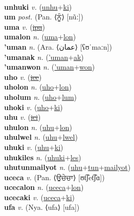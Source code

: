  \label{unhulyan} \\
\textbf{unhuki} \textit{v.} (\hyperref[unhu]{unhu}+\hyperref[ki]{ki})
 \label{unhuki} \\
\textbf{um} \textit{post.} (Pan. ⟨ਨੂੰ⟩ [nũː])
 \label{um} \\
\textbf{uma} \textit{v.} (\hyperref[ipa]{\sout{ipa}})
 \label{uma} \\
\textbf{umalon} \textit{n.} (\hyperref[uma]{uma}+\hyperref[lon]{lon})
 \label{umalon} \\
\textbf{'uman} \textit{n.} (Ara. ⟨عمان‎⟩ [ʕʊˈmaːn])
 \label{'uman} \\
\textbf{'umanak} \textit{n.} (\hyperref['uman]{'uman}+\hyperref[ak]{ak})
 \label{'umanak} \\
\textbf{'umanwon} \textit{n.} (\hyperref['uman]{'uman}+\hyperref[won]{won})
 \label{'umanwon} \\
\textbf{uho} \textit{v.} (\hyperref[ice]{\sout{ice}})
 \label{uho} \\
\textbf{uholon} \textit{n.} (\hyperref[uho]{uho}+\hyperref[lon]{lon})
 \label{uholon} \\
\textbf{uholum} \textit{n.} (\hyperref[uho]{uho}+\hyperref[lum]{lum})
 \label{uholum} \\
\textbf{uhoki} \textit{v.} (\hyperref[uho]{uho}+\hyperref[ki]{ki})
 \label{uhoki} \\
\textbf{uhu} \textit{v.} (\hyperref[ici]{\sout{ici}})
 \label{uhu} \\
\textbf{uhulon} \textit{n.} (\hyperref[uhu]{uhu}+\hyperref[lon]{lon})
 \label{uhulon} \\
\textbf{uhulwel} \textit{n.} (\hyperref[uhu]{uhu}+\hyperref[lwel]{lwel})
 \label{uhulwel} \\
\textbf{uhuki} \textit{v.} (\hyperref[uhu]{uhu}+\hyperref[ki]{ki})
 \label{uhuki} \\
\textbf{uhukiles} \textit{n.} (\hyperref[uhuki]{uhuki}+\hyperref[les]{les})
 \label{uhukiles} \\
\textbf{uhutunmailyot} \textit{n.} (\hyperref[uhu]{uhu}+\hyperref[tun]{tun}+\hyperref[mailyot]{mailyot})
 \label{uhutunmailyot} \\
\textbf{uceca} \textit{v.} (Pan. ⟨ਉਚੇਚਾ⟩ [ʊt͡ʃet͡ʃɑ])
 \label{uceca} \\
\textbf{ucecalon} \textit{n.} (\hyperref[uceca]{uceca}+\hyperref[lon]{lon})
 \label{ucecalon} \\
\textbf{ucecaki} \textit{v.} (\hyperref[uceca]{uceca}+\hyperref[ki]{ki})
 \label{ucecaki} \\
\textbf{ufa} \textit{v.} (Nya. ⟨ufa⟩ [ufa])
